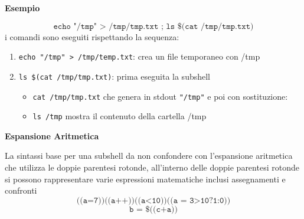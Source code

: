 \begin{flushleft}
  \textbf{Esempio}\par 
  $$\texttt{echo "/tmp" > /tmp/tmp.txt ; ls \$(cat /tmp/tmp.txt)}$$
  i comandi sono eseguiti rispettando la sequenza:
  \begin{enumerate}
    \item \texttt{echo "/tmp" > /tmp/temp.txt}: crea un file temporaneo con /tmp
    \item \texttt{ls \$(cat /tmp/tmp.txt)}: \ace prima eseguita la subshell 
          \begin{itemize}
            \item \texttt{cat /tmp/tmp.txt} che genera in stdout \texttt{"/tmp"} e poi con sostituzione:
            \item \texttt{ls /tmp} mostra il contenuto della cartella /tmp
          \end{itemize}
  \end{enumerate}
\end{flushleft}
\begin{flushleft}
  \textbf{Espansione Aritmetica}\par 
  La sintassi base per una subshell \ace da non confondere con l'espansione aritmetica 
  che utilizza le doppie parentesi rotonde, all'interno delle doppie parentesi rotonde
  si possono rappresentare varie espressioni matematiche inclusi assegnamenti e confronti 
  $$\texttt{((a=7))((a++))((a<10))((a = 3>10?1:0))}$$
  $$\texttt{b = \$((c+a))}$$
\end{flushleft}
